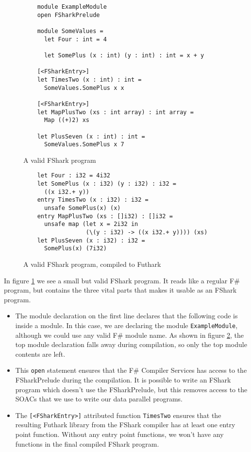 \begin{figure}
  \centering
  \begin{verbatim}
    module ExampleModule
    open FSharkPrelude

    module SomeValues =
      let Four : int = 4

      let SomePlus (x : int) (y : int) : int = x + y

    [<FSharkEntry>]
    let TimesTwo (x : int) : int =
      SomeValues.SomePlus x x
  
    [<FSharkEntry>]
    let MapPlusTwo (xs : int array) : int array =
      Map ((+)2) xs

    let PlusSeven (x : int) : int =
      SomeValues.SomePlus x 7
  \end{verbatim}
  \caption{A valid FShark program}
  \label{fig:validfsharkprogram}
\end{figure}

\begin{figure}
  \centering
  \begin{verbatim}
    let Four : i32 = 4i32
    let SomePlus (x : i32) (y : i32) : i32 =
      ((x i32.+ y))
    entry TimesTwo (x : i32) : i32 =
      unsafe SomePlus(x) (x)
    entry MapPlusTwo (xs : []i32) : []i32 =
      unsafe map (let x = 2i32 in
                  (\(y : i32) -> ((x i32.+ y)))) (xs)
    let PlusSeven (x : i32) : i32 =
      SomePlus(x) (7i32)
      \end{verbatim}
  \caption{A valid FShark program, compiled to Futhark}
  \label{fig:validfsharkprogramresult}
\end{figure}

  
In figure \ref{fig:validfsharkprogram} we see a small but valid FShark program. It
reads like a regular F\# program, but contains the three vital parts that makes
it usable as an FShark program.
\begin{itemize}
\item The module declaration on the first line declares that the following code
  is inside a module. In this case, we are declaring the module
  \texttt{ExampleModule}, although we could use any valid F\# module name.
  As shown in figure \ref{fig:validfsharkprogramresult}, the top module
  declaration falls away during compilation, so only the top module contents are
  left.

\item This \texttt{open} statement ensures that the F\# Compiler Services has
  access to the FSharkPrelude during the compilation. It is possible to write an
  FShark program which doesn't use the FSharkPrelude, but this removes access to
  the SOACs that we use to write our data parallel programs.

\item The \texttt{[<FSharkEntry>]} attributed function \texttt{TimesTwo} ensures
  that the resulting Futhark library from the FShark compiler has at least one
  entry point function.
  Without any entry point functions, we won't have any functions in the final
  compiled FShark program.
\end{itemize}

